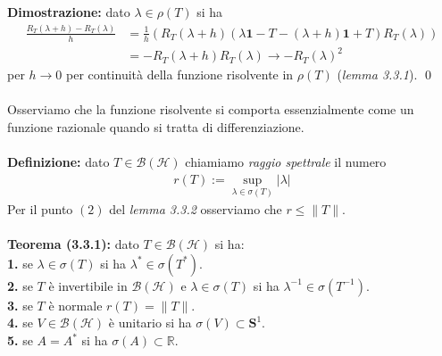 \documentclass{article}
\numberwithin{equation}{subsection}
\begin{document}
\textbf{Dimostrazione:} dato $\lambda \in \rho(T)$ si ha 
\begin{align*}
    \frac{R_T(\lambda + h) - R_T(\lambda)}{h} &= \frac{1}{h}\left(R_T(\lambda + h)(\lambda\mathbf{1} - T - (\lambda + h)\mathbf{1} + T)R_T(\lambda)\right)  \\
    &= -R_T(\lambda + h)R_T(\lambda) \rightarrow -R_T(\lambda)^2 
\end{align*}
per $h \rightarrow 0$ per continuità della funzione risolvente in $\rho(T)$ (\textit{lemma 3.3.1}). \qed \\ \\
Osserviamo che la funzione risolvente si comporta essenzialmente come un funzione razionale quando si tratta di differenziazione. \\ \\
\textbf{Definizione:} dato $T \in \mathcal{B}(\mathcal{H})$ chiamiamo \textit{raggio spettrale} il numero 
\begin{align*}
    r(T) := \sup_{\lambda \in \sigma(T)}|\lambda| 
\end{align*}
Per il punto $(2)$ del \textit{lemma 3.3.2} osserviamo che $r \leq \|T\|$. \\ \\
\textbf{Teorema (3.3.1):} dato $T \in \mathcal{B}(\mathcal{H})$ si ha: \\
\textbf{1.} se $\lambda \in \sigma(T)$ si ha $\lambda^* \in \sigma(T^*)$. \\
\textbf{2.} se $T$ è invertibile in $\mathcal{B}(\mathcal{H})$ e $\lambda \in \sigma(T)$ si ha $\lambda^{-1} \in \sigma(T^{-1})$. \\
\textbf{3.} se $T$ è normale $r(T) = \|T\|$. \\
\textbf{4.} se $V \in \mathcal{B}(\mathcal{H})$ è unitario si ha $\sigma(V) \subset \mathbf{S}^1$. \\
\textbf{5.} se $A = A^*$ si ha $\sigma(A) \subset \mathbb{R}$. \\
\end{document}
